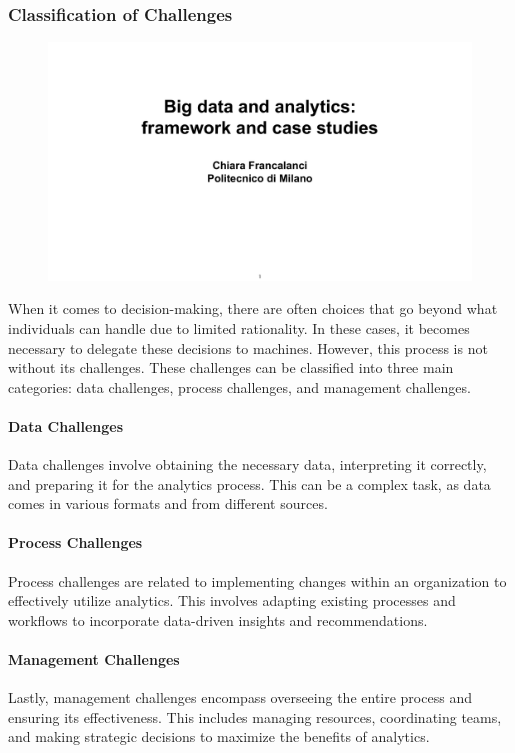 \subsubsection{Classification of Challenges}

\begin{figure}[!h]
    \centering
    \includegraphics[page=39, trim = 0.3cm 2.5cm 1cm 4cm, clip, width=\textwidth]{images/06 - BIG_DATA.pdf}
\end{figure}

When it comes to decision-making, there are often choices that go beyond
what individuals can handle due to limited rationality. In these cases,
it becomes necessary to delegate these decisions to machines. However,
this process is not without its challenges. These challenges can be
classified into three main categories: data challenges, process
challenges, and management challenges.

\paragraph{Data Challenges}
Data challenges involve obtaining the necessary data, interpreting it
correctly, and preparing it for the analytics process. This can be a
complex task, as data comes in various formats and from different
sources.

\paragraph{Process Challenges}
Process challenges are related to implementing changes within an
organization to effectively utilize analytics. This involves adapting
existing processes and workflows to incorporate data-driven insights and
recommendations.

\paragraph{Management Challenges}
Lastly, management challenges encompass overseeing the entire process
and ensuring its effectiveness. This includes managing resources,
coordinating teams, and making strategic decisions to maximize the
benefits of analytics.

